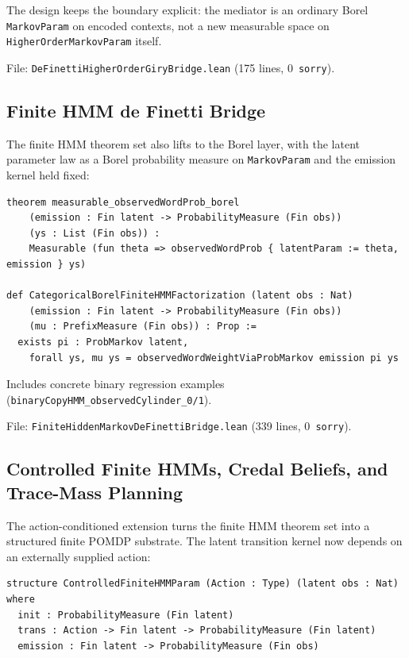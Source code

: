 \documentclass[11pt,a4paper]{article}
\theoremstyle{definition}
\begin{document}
The design keeps the boundary explicit: the mediator is an ordinary Borel
\texttt{MarkovParam} on encoded contexts, not a new measurable space on
\texttt{HigherOrderMarkovParam} itself.

File: \texttt{DeFinettiHigherOrderGiryBridge.lean} (175 lines, 0~\texttt{sorry}).

\subsection{Finite HMM de Finetti Bridge}

The finite HMM theorem set also lifts to the Borel layer, with the latent
parameter law as a Borel probability measure on \texttt{MarkovParam} and
the emission kernel held fixed:

\begin{lstlisting}
theorem measurable_observedWordProb_borel
    (emission : Fin latent -> ProbabilityMeasure (Fin obs))
    (ys : List (Fin obs)) :
    Measurable (fun theta => observedWordProb { latentParam := theta, emission } ys)

def CategoricalBorelFiniteHMMFactorization (latent obs : Nat)
    (emission : Fin latent -> ProbabilityMeasure (Fin obs))
    (mu : PrefixMeasure (Fin obs)) : Prop :=
  exists pi : ProbMarkov latent,
    forall ys, mu ys = observedWordWeightViaProbMarkov emission pi ys
\end{lstlisting}

Includes concrete binary regression examples (\texttt{binaryCopyHMM\_observedCylinder\_0/1}).

File: \texttt{FiniteHiddenMarkovDeFinettiBridge.lean} (339 lines, 0~\texttt{sorry}).

\subsection{Controlled Finite HMMs, Credal Beliefs, and Trace-Mass Planning}

The action-conditioned extension turns the finite HMM theorem set into a structured
finite POMDP substrate.  The latent transition kernel now depends on an
externally supplied action:

\begin{lstlisting}
structure ControlledFiniteHMMParam (Action : Type) (latent obs : Nat) where
  init : ProbabilityMeasure (Fin latent)
  trans : Action -> Fin latent -> ProbabilityMeasure (Fin latent)
  emission : Fin latent -> ProbabilityMeasure (Fin obs)
\end{lstlisting}
\end{document}
